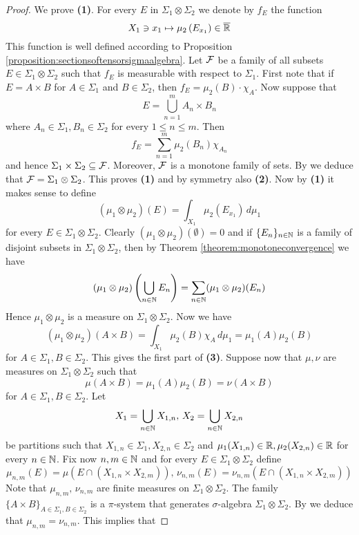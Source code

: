 \begin{proof}
We prove \textbf{(1)}. For every $E$ in $\Sigma_1\otimes \Sigma_2$ we denote by $f_E$ the function
$$X_1\ni x_1 \mapsto \mu_2\left(E_{x_1}\right)\in \overline{{\mathbb R}}$$
This function is well defined according to Proposition \ref{proposition:sectionsoftensorsigmaalgebra}. Let ${\mathcal F}$ be a family of all subsets $E\in \Sigma_1\otimes \Sigma_2$ such that $f_E$ is measurable with respect to $\Sigma_1$. First note that if $E=A\times B$ for $A\in \Sigma_1$ and $B\in \Sigma_2$, then  $f_E = \mu_2(B)\cdot \chi_A$. Now suppose that
$$E= \bigcup_{n=1}^mA_n\times B_n$$
where $A_n\in \Sigma_1,B_n\in \Sigma_2$ for every $1\leq n\leq m$. Then
$$f_E = \sum_{n=1}^m\mu_2(B_n)\chi_{A_n}$$
and hence $\Sigma_1\times \Sigma_2\subseteq {\mathcal F}$. Moreover, ${\mathcal F}$ is a monotone family of sets. By {\cite[Theorem 1.5]{Introductiontomeasuretheory}} we deduce that ${\mathcal F} = \Sigma_1\otimes \Sigma_2$. This proves \textbf{(1)} and by symmetry also \textbf{(2)}. Now by \textbf{(1)} it makes sense to define
$$(\mu_1\otimes \mu_2)(E) = \int_{X_1}\mu_2(E_{x_1})\,d\mu_1$$
for every $E\in \Sigma_1\otimes \Sigma_2$. Clearly $(\mu_1\otimes \mu_2)(\emptyset) = 0$ and if $\{E_n\}_{n\in {\mathbb N}}$ is a family of disjoint subsets in $\Sigma_1\otimes \Sigma_2$, then by Theorem \ref{theorem:monotoneconvergence} we have
$$(\mu_1\otimes \mu_2)\left(\bigcup_{n\in {\mathbb N}}E_n\right) = \sum_{n\in {\mathbb N}}(\mu_1\otimes \mu_2)(E_n)$$
Hence $\mu_1\otimes \mu_2$ is a measure on $\Sigma_1\otimes \Sigma_2$. Now we have
$$(\mu_1\otimes \mu_2)\left(A\times B\right) = \int_{X_1}\mu_2(B)\chi_A\,d\mu_1 = \mu_1(A)\mu_2(B)$$
for $A\in \Sigma_1, B\in \Sigma_2$. This gives the first part of \textbf{(3)}. Suppose now that $\mu,\nu$ are measures on $\Sigma_1\otimes \Sigma_2$ such that
$$\mu(A\times B) = \mu_1(A)\mu_2(B) = \nu(A\times B)$$
for $A\in \Sigma_1,B\in \Sigma_2$. Let 
$$X_1 = \bigcup_{n\in {\mathbb N}}X_{1,n},\,X_2 = \bigcup_{n\in {\mathbb N}}X_{2,n}$$
be partitions such that $X_{1,n}\in \Sigma_1,X_{2,n}\in \Sigma_2$ and $\mu_1(X_{1,n})\in {\mathbb R},\mu_2(X_{2,n})\in {\mathbb R}$ for every $n\in {\mathbb N}$. Fix now $n,m\in {\mathbb N}$ and for every $E\in \Sigma_1\otimes \Sigma_2$ define
$$\mu_{n,m}(E) = \mu\left(E\cap (X_{1,n}\times  X_{2,m})\right),\,\nu_{n,m}(E) = \nu_{n,m}\left(E\cap (X_{1,n}\times X_{2,m})\right)$$
Note that $\mu_{n,m},\,\nu_{n,m}$ are finite measures on $\Sigma_1\otimes \Sigma_2$. The family $\big\{A\times B\big\}_{A\in \Sigma_1,B\in \Sigma_2}$ is a $\pi$-system that generates $\sigma$-algebra $\Sigma_1\otimes \Sigma_2$. By {\cite[Theorem 2.6]{Introductiontomeasuretheory}} we deduce that $\mu_{n,m} = \nu_{n,m}$. This implies that

\end{proof}
